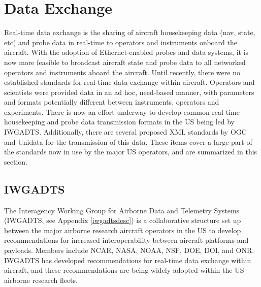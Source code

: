 % 
% 
% 


\section{Data Exchange}\label{dataex}

Real-time data exchange is the sharing of aircraft housekeeping data (nav, state, etc) and probe data in real-time to operators and instruments onboard the aircraft.  With the adoption of Ethernet-enabled probes and data systems, it is now more feasible to broadcast aircraft state and probe data to all networked operators and instruments aboard the aircraft.  Until recently, there were no established standards for real-time data exchange within aircraft.  Operators and scientists were provided data in an ad hoc, need-based manner, with parameters and formats potentially different between instruments, operators and experiments.  There is now an effort underway to develop common real-time housekeeping and probe data transmission formats in the US being led by IWGADTS.  Additionally, there are several proposed XML standards by OGC and Unidata for the transmission of this data.  These items cover a large part of the standards now in use by the major US operators, and are summarized in this section.  

\subsection{IWGADTS}\label{iwgadts}
%
The Interagency Working Group for Airborne Data and Telemetry Systems (IWGADTS, see Appendix \ref{iwgadtsdesc}) is a collaborative structure set up between the major airborne research aircraft operators in the US to develop recommendations for increased interoperability between aircraft platforms and payloads.  Members include NCAR, NASA, NOAA, NSF, DOE, DOI, and ONR.  IWGADTS has developed recommendations for real-time data exchange within aircraft, and these recommendations are being widely adopted within the US airborne research fleets.

